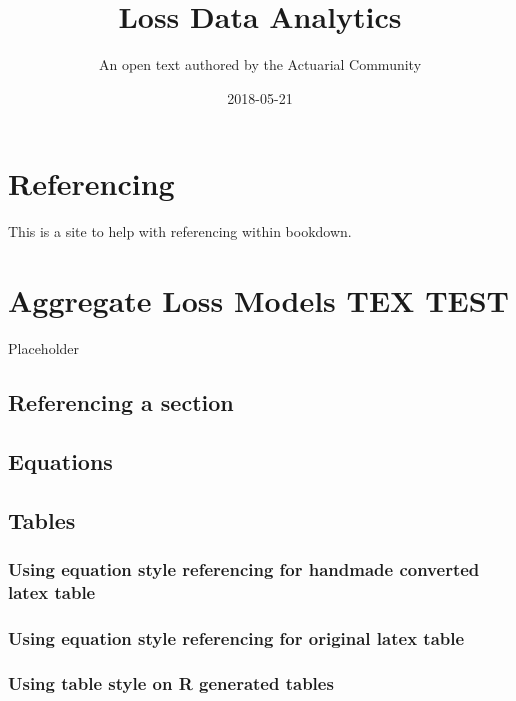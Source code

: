 \documentclass[]{book}
\title{Loss Data Analytics}
\author{An open text authored by the Actuarial Community}
\date{2018-05-21}
\theoremstyle{definition}
\theoremstyle{definition}
\theoremstyle{definition}
\theoremstyle{remark}
\begin{document}
\maketitle

{
\setcounter{tocdepth}{2}
\tableofcontents
}
\chapter{Referencing}\label{referencing}

This is a site to help with referencing within bookdown.

\chapter{Aggregate Loss Models TEX
TEST}\label{aggregate-loss-models-tex-test}

Placeholder

\section{Referencing a section}\label{referencing-a-section}

\section{Equations}\label{S:Referencing-equations}

\section{Tables}\label{S:Referencing-tables}

\subsection{Using equation style referencing for handmade converted
latex
table}\label{using-equation-style-referencing-for-handmade-converted-latex-table}

\subsection{Using equation style referencing for original latex
table}\label{using-equation-style-referencing-for-original-latex-table}

\subsection{Using table style on R generated
tables}\label{using-table-style-on-r-generated-tables}
\end{document}
